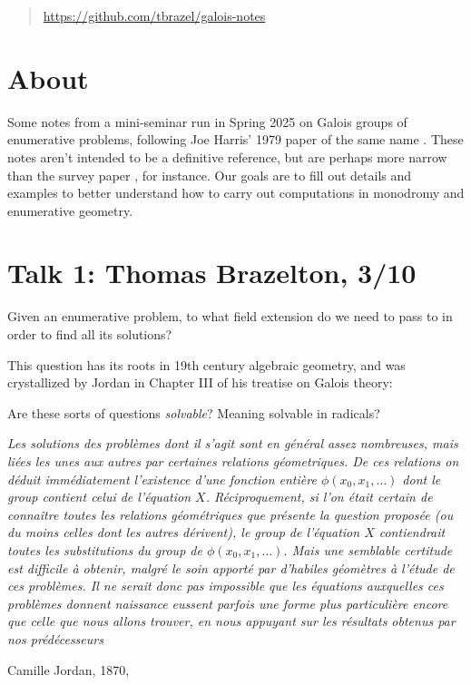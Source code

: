 \documentclass[11pt]{amsart}
\newcommand{\quoteblock}[2]{\epigraph{\itshape#1}{#2}}
\begin{document}
\begin{abstract} \href{https://github.com/tbrazel/galois-notes}{https://github.com/tbrazel/galois-notes}
\end{abstract}


\maketitle


\setcounter{section}{-1}
\section{About}

Some notes from a mini-seminar run in Spring 2025 on Galois groups of enumerative problems, following Joe Harris' 1979 paper of the same name \cite{Harris-Galois}. These notes aren't intended to be a definitive reference, but are perhaps more narrow than the survey paper \cite{SottileYahl}, for instance. Our goals are to fill out details and examples to better understand how to carry out computations in monodromy and enumerative geometry.

\section{Talk 1: Thomas Brazelton, 3/10}

\begin{question} Given an enumerative problem, to what field extension do we need to pass to in order to find all its solutions?
\end{question}

This question has its roots in 19th century algebraic geometry, and was crystallized by Jordan in Chapter III of his treatise on Galois theory:

\begin{question} Are these sorts of questions \textit{solvable}? Meaning solvable in radicals?
\end{question}


\quoteblock{%
Les solutions des problèmes dont il s'agit sont en général assez nombreuses, mais liées les unes aux autres par certaines relations géometriques. De ces relations on déduit immédiatement l'existence d'une fonction entière $\phi(x_0,x_1,\ldots)$ dont le group contient celui de l'équation $X$. Réciproquement, si l'on était certain de connaître \emph{toutes} les relations géométriques que présente la question proposée (ou du moins celles dont les autres dérivent), le group de l'équation $X$ contiendrait toutes les substitutions du group de $\phi(x_0,x_1,\ldots)$. Mais une semblable certitude est difficile à obtenir, malgré le soin apporté par d'habiles géomètres à l'étude de ces problèmes. Il ne serait donc pas impossible que les équations auxquelles ces problèmes donnent naissance eussent parfois une forme plus particulière encore que celle que nous allons trouver, en nous appuyant sur les résultats obtenus par nos prédécesseurs}{%
Camille Jordan, 1870, \cite[pp.301-302]{Jordan}}
\end{document}
